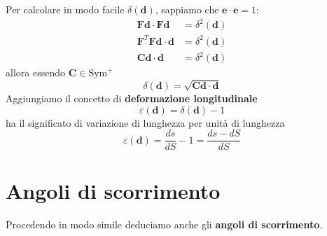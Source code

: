 \documentclass[10pt,a4paper,twoside]{book}
\begin{document}
Per calcolare in modo facile $\delta (\mathbf{d})$, sappiamo che $\mathbf{e} \cdotp \mathbf{e} =1$:
\begin{equation*}
\begin{aligned}
\mathbf{Fd} \cdotp \mathbf{Fd} & =\delta ^{2}(\mathbf{d})\\
\mathbf{F}^{T}\mathbf{Fd} \cdotp \mathbf{d} & =\delta ^{2}(\mathbf{d})\\
\mathbf{Cd} \cdotp \mathbf{d} & =\delta ^{2}(\mathbf{d})
\end{aligned}
\end{equation*}
allora essendo $\mathbf{C} \in \mathrm{Sym}^{+}$
\begin{equation*}
\boxed{\delta (\mathbf{d}) =\sqrt{\mathbf{Cd} \cdotp \mathbf{d}}}
\end{equation*}
Aggiungiamo il concetto di \textbf{deformazione longitudinale}
\begin{equation*}
\boxed{\varepsilon (\mathbf{d}) =\delta (\mathbf{d}) -1}
\end{equation*}
ha il significato di variazione di lunghezza per unità di lunghezza
\begin{equation*}
\varepsilon (\mathbf{d}) =\frac{ds}{dS} -1=\frac{ds-dS}{dS}
\end{equation*}
\section{Angoli di scorrimento}

Procedendo in modo simile deduciamo anche gli \textbf{angoli di scorrimento}.

\end{document}
